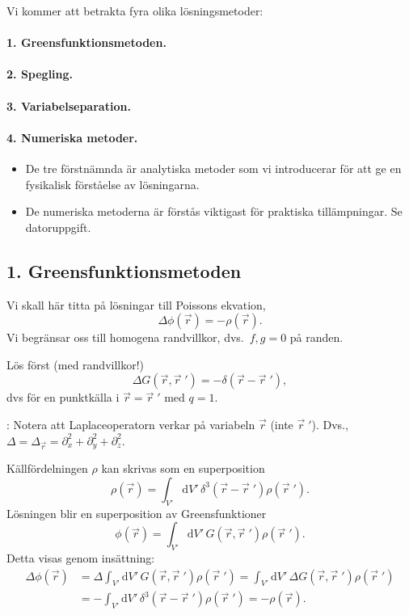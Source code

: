 \documentclass[%
oneside,                 %
final,                   %
10pt]{article}
\newcommand{\longinlinecomment}[3]{{\color{red}{\bf #1}: #2}}
\begin{document}
Vi kommer att betrakta fyra olika lösningsmetoder:

\paragraph{1. Greensfunktionsmetoden.}
\paragraph{2. Spegling.}
\paragraph{3. Variabelseparation.}
\paragraph{4. Numeriska metoder.}
\begin{itemize}
\item De tre förstnämnda är analytiska metoder som vi introducerar för att ge en fysikalisk förståelse av lösningarna.

\item De numeriska metoderna är förstås viktigast för praktiska tillämpningar. Se datoruppgift.
\end{itemize}

\noindent
\subsection{1. Greensfunktionsmetoden}

Vi skall här titta på lösningar till Poissons ekvation,
$$
\Delta\phi(\vec{r})=-\rho(\vec{r}).
$$ 
Vi begränsar oss till homogena randvillkor, dvs.~$f,g=0$ på randen.

Lös först (med randvillkor!)
$$
\Delta G(\vec{r},\vec{r}{\;}') = -\delta(\vec{r} - \vec{r}{\;}'),
$$
dvs för en punktkälla i $\vec{r} = \vec{r}{\;}'$ med $q=1$. 

\longinlinecomment{Comment 1}{ Notera att Laplaceoperatorn verkar på variabeln $\vec{r}$ (inte $\vec{r}{\;}'$). Dvs., $\Delta = \Delta_{\vec{r}} = \partial_x^2 + \partial_y^2 + \partial_z^2$. }{ Notera att Laplaceoperatorn verkar }

Källfördelningen $\rho$ kan skrivas som en superposition
$$
\rho(\vec{r})=\int_{V'}\mbox{d}V'\,\delta^3(\vec{r}-\vec{r}{\;}')\rho(\vec{r}{\;}').
$$
Lösningen blir en superposition av Greensfunktioner
$$
\phi(\vec{r})=\int_{V'}\mbox{d}V'\,G(\vec{r},\vec{r}{\;}')\rho(\vec{r}{\;}').
$$
Detta visas genom insättning:
\begin{align}
\Delta\phi(\vec{r}) &= \Delta\int_{V'}\mbox{d}V'\,G(\vec{r},\vec{r}{\;}')\rho(\vec{r}{\;}')
=\int_{V'}\mbox{d}V'\,\Delta G(\vec{r},\vec{r}{\;}')\rho(\vec{r}{\;}') \nonumber \\
&=-\int_{V'}\mbox{d}V'\,\delta^3(\vec{r}-\vec{r}{\;}')\rho(\vec{r}{\;}')
=-\rho(\vec{r}).
\end{align}
\end{document}
